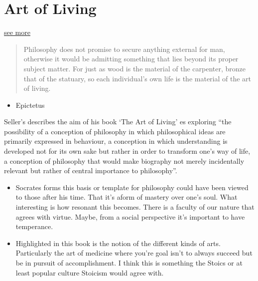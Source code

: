 \documentclass[11pt]{article}
\begin{document}
\hypertarget{art-of-living}{%
\section{Art of Living}\label{art-of-living}}

\href{../books/ArtOfLiving.md}{see more}

\begin{quote}
Philosophy does not promise to secure anything external for man,
otherwise it would be admitting something that lies beyond its proper
subject matter. For just as wood is the material of the carpenter,
bronze that of the statuary, so each individual's own life is the
material of the art of living.
\end{quote}

\begin{itemize}
\tightlist
\item
  Epictetus
\end{itemize}

Seller's describes the aim of his book `The Art of Living' es exploring
``the possibility of a conception of philosophy in which philosophical
ideas are primarily expressed in behaviour, a conception in which
understanding is developed not for its own sake but rather in order to
transform one's way of life, a conception of philosophy that would make
biography not merely incidentally relevant but rather of central
importance to philosophy''.

\begin{itemize}
\tightlist
\item
  Socrates forms this basis or template for philosophy could have been
  viewed to those after his time. That it's aform of mastery over one's
  soul. What interesting is how resonant this becomes. There is a
  faculty of our nature that agrees with virtue. Maybe, from a social
  perspective it's important to have temperance.
\item
  Highlighted in this book is the notion of the different kinds of arts.
  Particularly the art of medicine where you're goal isn't to always
  succeed but be in pursuit of accomplishment. I think this is something
  the Stoics or at least popular culture Stoicism would agree with.
\end{itemize}
\end{document}
